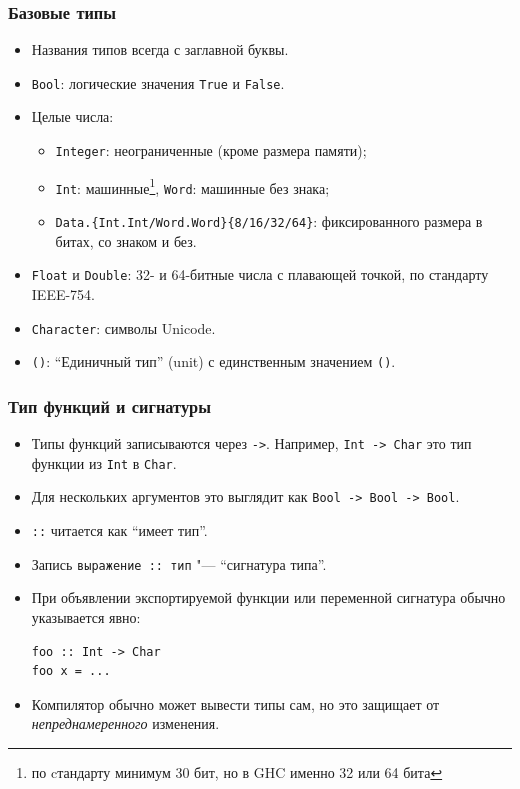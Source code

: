 \documentclass[10pt]{beamer}
\begin{document}
\begin{frame}[fragile]
\frametitle{Базовые типы}
\begin{itemize}
    \item Названия типов всегда с заглавной буквы.
    \item \lstinline|Bool|: логические значения \lstinline|True| и \lstinline|False|.
    \item Целые числа:
    \begin{itemize}
        \item \lstinline|Integer|: неограниченные (кроме размера памяти);
        \item \lstinline|Int|: машинные\footnote{по cтандарту минимум 30 бит, но в GHC именно 32 или 64 бита}, \lstinline|Word|: машинные без знака;
        \item \lstinline|Data.{Int.Int/Word.Word}{8/16/32/64}|: фиксированного размера в битах, со знаком и без.
    \end{itemize}
    \item \lstinline|Float| и \lstinline|Double|: 32- и 64-битные числа с плавающей точкой, по стандарту IEEE-754.
    \item \lstinline|Character|: символы Unicode.
    \item \lstinline|()|: \enquote{Единичный тип} (unit) с единственным значением \lstinline|()|.
\end{itemize}
\end{frame}

\begin{frame}[fragile]
\frametitle{Тип функций и сигнатуры}
\begin{itemize}
    \item Типы функций записываются через \lstinline|->|. Например, \lstinline|Int -> Char| это тип функции из \lstinline|Int| в \lstinline|Char|.
    
    \item Для нескольких аргументов это выглядит как \pause\lstinline|Bool -> Bool -> Bool|.
    
    \item \lstinline|::| читается как \enquote{имеет тип}.
    
    \item Запись \lstinline|выражение :: тип| "--- \enquote{сигнатура типа}.
    
    \item При объявлении экспортируемой функции или переменной  сигнатура обычно указывается явно:
\begin{lstlisting}
foo :: Int -> Char
foo x = ...
\end{lstlisting}
    \item Компилятор обычно может вывести типы сам, но это защищает от \emph{непреднамеренного} изменения.
\end{itemize}
\end{frame}
\end{document}
